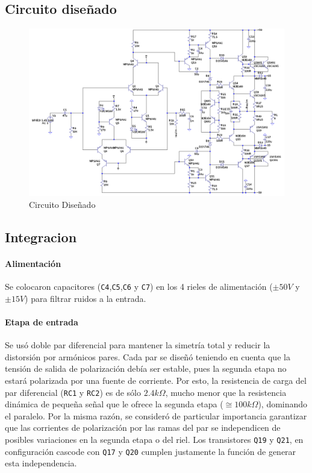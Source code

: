 \documentclass[a4paper,12pt,twoside]{article}
\begin{document}
\newpage


\subsection{Circuito diseñado}


\begin{figure}[H]
\includegraphics[width=0.75\paperheight,angle=90,origin=c]{img/circuito}
\caption{Circuito Diseñado}
\label{fig:circuito} 
\end{figure}

\subsection{Integracion}
\paragraph{Alimentación}

Se colocaron capacitores (\texttt{C4},\texttt{C5},\texttt{C6} y \texttt{C7}) en los 4 rieles de alimentación ($\pm 50V$ y $\pm 15V$) para filtrar ruidos a la entrada.

\paragraph{Etapa de entrada}

Se usó doble par diferencial para mantener la simetría total y reducir la distorsión por armónicos pares. Cada par se diseñó teniendo en cuenta que la tensión de salida de polarización debía ser estable, pues la segunda etapa no estará polarizada por una fuente de corriente. Por esto, la resistencia de carga del par diferencial (\texttt{RC1} y \texttt{RC2}) es de sólo $2.4k\Omega$, mucho menor que la resistencia dinámica de pequeña señal que le ofrece la segunda etapa ($\cong 100k\Omega$), dominando el paralelo.
Por la misma razón, se consideró de particular importancia garantizar que las corrientes de polarización por las ramas del par se independicen de posibles variaciones en la segunda etapa o del riel. Los transistores \texttt{Q19} y \texttt{Q21}, en configuración cascode con \texttt{Q17} y \texttt{Q20} cumplen justamente la función de generar esta independencia.
\end{document}

